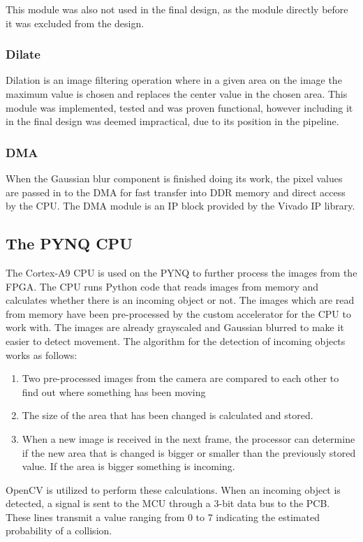 This module was also not used in the final design, as the module directly before it was excluded from the design.

\subsubsection{Dilate}
Dilation is an image filtering operation where in a given area on the image the maximum value is chosen and replaces the center value in the chosen area. This module was implemented, tested and was proven functional, however including it in the final design was deemed impractical, due to its position in the pipeline. 
\subsubsection{DMA}
When the Gaussian blur component is finished doing its work, the pixel values are passed in to the DMA for fast transfer into DDR memory and direct access by the CPU.
The DMA module is an IP block provided by the Vivado IP library.


\subsection{The PYNQ CPU}
The Cortex-A9 CPU is used on the PYNQ to further process the images from the FPGA. The CPU runs Python code that reads images from memory and calculates whether there is an incoming object or not. The images which are read from memory have been pre-processed by the custom accelerator for the CPU to work with. The images are already grayscaled and Gaussian blurred to make it easier to detect movement. The algorithm for the detection of incoming objects works as follows:

\begin{enumerate}
    \item Two pre-processed images from the camera are compared to each other to find out where something has been moving
    \item The size of the area that has been changed is calculated and stored. 
    \item When a new image is received in the next frame, the processor can determine if the new area that is changed is bigger or smaller than the previously stored value. If the area is bigger something is incoming.
\end{enumerate}

OpenCV is utilized to perform these calculations. When an incoming object is detected, a signal is sent to the MCU through a 3-bit data bus to the PCB. These lines transmit a value ranging from 0 to 7 indicating the estimated probability of a collision.

